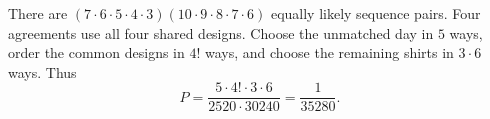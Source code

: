 There are $(7\cdot6\cdot5\cdot4\cdot3)(10\cdot9\cdot8\cdot7\cdot6)$ equally likely sequence pairs. Four agreements use all four shared designs. Choose the unmatched day in $5$ ways, order the common designs in $4!$ ways, and choose the remaining shirts in $3\cdot6$ ways. Thus
\[P=\dfrac{5\cdot4!\cdot3\cdot6}{2520\cdot30240}=\boxed{\dfrac{1}{35280}}.\]
